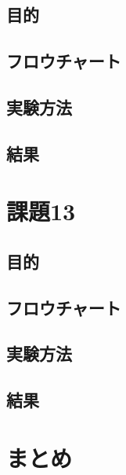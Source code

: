 \documentclass{jarticle}
\begin{document}
\subsection{目的}

\subsection{フロウチャート}

\subsection{実験方法}

\subsection{結果}



\section{課題13}


\subsection{目的}

\subsection{フロウチャート}

\subsection{実験方法}

\subsection{結果}


\section{まとめ}
\end{document}
